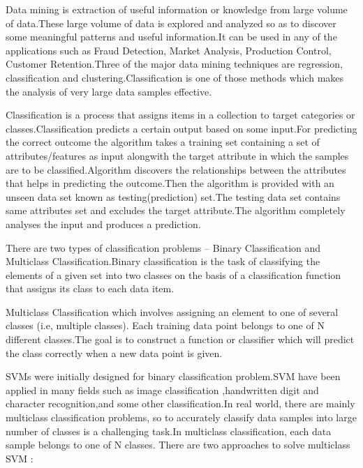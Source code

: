 \documentclass[a4paper, 10pt, conference]{ieeeconf}      %
\begin{document}
Data mining is extraction of useful information or knowledge from large volume of data.These large volume of data is explored and analyzed so as to discover some meaningful patterns and useful information.It can be used in any of the applications such as Fraud Detection, Market Analysis, Production Control, Customer Retention.Three of the major data mining techniques are regression, classification and clustering.Classification is one of those methods which makes the analysis of very large data samples effective.
\par
\par 
Classification is a process that assigns items in a collection to target categories or classes.Classification predicts a certain output based on some input.For predicting the correct outcome the algorithm takes a training set containing a set of attributes/features as input alongwith the target attribute in which the samples are to be classified.Algorithm discovers the relationships between the attributes that helps in predicting the outcome.Then the algorithm is provided with an unseen data set known as testing(prediction) set.The testing data set contains same attributes set and excludes the target attribute.The algorithm completely analyses the input and produces a prediction.
\par 
There are two types of classification problems – Binary Classification and Multiclass Classification.Binary classification is the task of classifying the elements of a given set into two classes on the basis of a classification function that assigns its class to each data item.
\par
Multiclass Classification which involves assigning an element to one of several classes (i.e, multiple classes). Each training data point belongs to one of N different classes.The goal is to construct a function or classifier which will predict the class correctly when a new data point is given.
\par
SVMs were initially designed for binary classification problem.SVM have been applied in many fields such as image classification ,handwritten digit and character recognition,and some other classification.In real world, there are mainly multiclass classification problems, so to accurately classify data samples into large number of classes is a challenging task.In multiclass classification, each data sample belongs to one of N classes.
There are two approaches to solve multiclass SVM :
\end{document}
